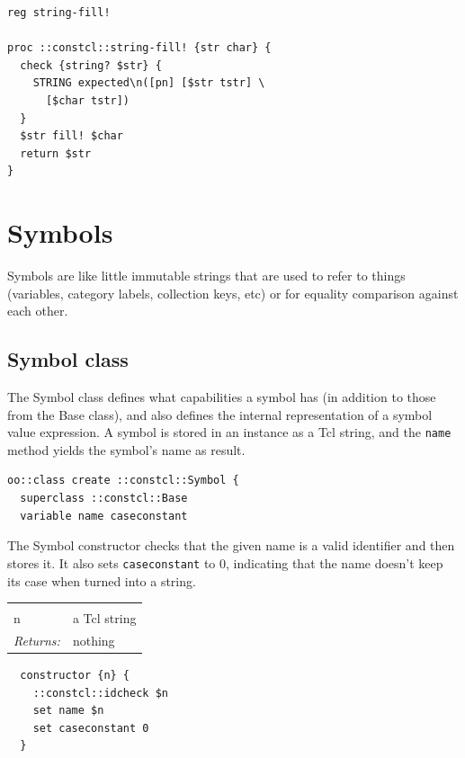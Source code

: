 \documentclass[twoside]{report}
\begin{document}
\begin{lstlisting}
reg string-fill!

proc ::constcl::string-fill! {str char} {
  check {string? $str} {
    STRING expected\n([pn] [$str tstr] \
      [$char tstr])
  }
  $str fill! $char
  return $str
}
\end{lstlisting}

\section{Symbols}
\label{symbols}

Symbols are like little immutable strings that are used to refer to things (variables, category labels, collection keys, etc) or for equality comparison against each other.

\subsection{Symbol class}
\label{symbol-class}

The Symbol class defines what capabilities a symbol has (in addition to those from the Base class), and also defines the internal representation of a symbol value expression. A symbol is stored in an instance as a Tcl string, and the \texttt{name} method yields the symbol's name as result.

\begin{lstlisting}
oo::class create ::constcl::Symbol {
  superclass ::constcl::Base
  variable name caseconstant
\end{lstlisting}

The Symbol constructor checks that the given name is a valid identifier and then stores it. It also sets \texttt{caseconstant} to 0, indicating that the name doesn't keep its case when turned into a string.

\noindent\begin{tabular}{ |p{1.9cm} p{8cm}| }
\hline
\rowcolor[HTML]{CCCCCC} \multicolumn{2}{|l|}{\bf Symbol constructor (internal)} \\
n & a Tcl string \\
\textit{Returns:} & nothing \\
\hline
\end{tabular}

\begin{lstlisting}
  constructor {n} {
    ::constcl::idcheck $n
    set name $n
    set caseconstant 0
  }
\end{lstlisting}
\end{document}
